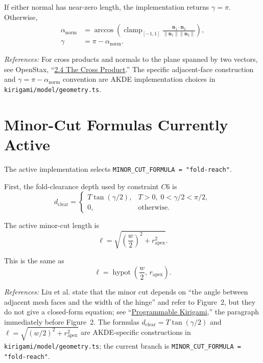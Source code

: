 \documentclass[11pt]{article}
\newcommand{\formularefs}[1]{%
\par\smallskip
\noindent\footnotesize\textit{References: }#1
\par\smallskip\normalsize
}
\begin{document}
If either normal has near-zero length, the implementation returns $\gamma=\pi$.
Otherwise,
\begin{align}
\alpha_{\mathrm{norm}} &=
\arccos\!\left(
\operatorname{clamp}_{[-1,1]}
\frac{\mathbf{n}_1\cdot\mathbf{n}_2}{\lVert \mathbf{n}_1\rVert \lVert \mathbf{n}_2\rVert}
\right), \\
\gamma &= \pi - \alpha_{\mathrm{norm}}.
\end{align}

\formularefs{For cross products and normals to the plane spanned by two vectors, see OpenStax, ``\href{https://openstax.org/books/calculus-volume-3/pages/2-4-the-cross-product}{2.4 The Cross Product}.'' The specific adjacent-face construction and \(\gamma=\pi-\alpha_{\mathrm{norm}}\) convention are AKDE implementation choices in \texttt{kirigami/model/geometry.ts}.}

\section{Minor-Cut Formulas Currently Active}

The active implementation selects \texttt{MINOR\_CUT\_FORMULA = "fold-reach"}.

First, the fold-clearance depth used by constraint $C6$ is
\begin{equation}
d_{\mathrm{clear}} =
\begin{cases}
T\tan(\gamma/2), & T>0,\; 0<\gamma/2<\pi/2,\\[4pt]
0, & \text{otherwise.}
\end{cases}
\end{equation}

The active minor-cut length is
\begin{equation}
\ell = \sqrt{\left(\frac{w}{2}\right)^2 + r_{\mathrm{apex}}^2}.
\end{equation}

This is the same as
\[
\ell = \operatorname{hypot}\!\left(\frac{w}{2},\,r_{\mathrm{apex}}\right).
\]

\formularefs{Liu et al. state that the minor cut depends on ``the angle between adjacent mesh faces and the width of the hinge'' and refer to Figure~2, but they do not give a closed-form equation; see ``\href{https://static1.squarespace.com/static/5783b6f903596e5098f3fce8/t/5dd2e95aee053940522eab1a/1574103423054/DETC2019-97557.pdf}{Programmable Kirigami},'' the paragraph immediately before Figure~2. The formulas \(d_{\mathrm{clear}}=T\tan(\gamma/2)\) and \(\ell=\sqrt{(w/2)^2+r_{\mathrm{apex}}^2}\) are AKDE-specific constructions in \texttt{kirigami/model/geometry.ts}; the current branch is \texttt{MINOR\_CUT\_FORMULA = "fold-reach"}.}
\end{document}
